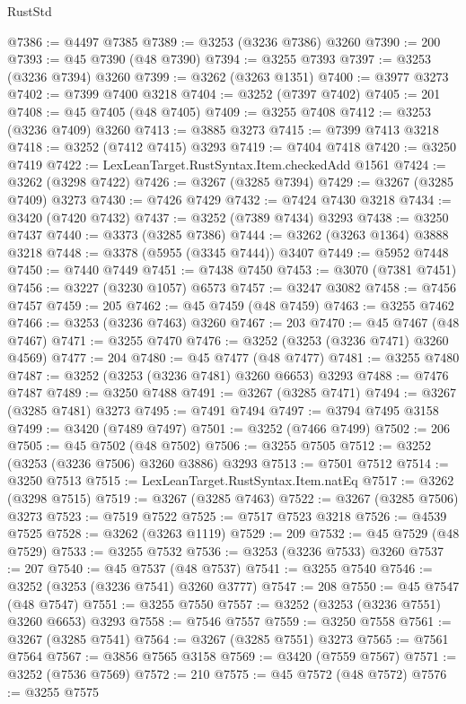 \begin{lexlean}{RustStd}
\begin{coremodule}
@7386 := @4497 @7385
@7389 := @3253 (@3236 @7386) @3260
@7390 := 200
@7393 := @45 @7390 (@48 @7390)
@7394 := @3255 @7393
@7397 := @3253 (@3236 @7394) @3260
@7399 := @3262 (@3263 @1351)
@7400 := @3977 @3273
@7402 := @7399 @7400 @3218
@7404 := @3252 (@7397 @7402)
@7405 := 201
@7408 := @45 @7405 (@48 @7405)
@7409 := @3255 @7408
@7412 := @3253 (@3236 @7409) @3260
@7413 := @3885 @3273
@7415 := @7399 @7413 @3218
@7418 := @3252 (@7412 @7415) @3293
@7419 := @7404 @7418
@7420 := @3250 @7419
@7422 := LexLeanTarget.RustSyntax.Item.checkedAdd @1561
@7424 := @3262 (@3298 @7422)
@7426 := @3267 (@3285 @7394)
@7429 := @3267 (@3285 @7409) @3273
@7430 := @7426 @7429
@7432 := @7424 @7430 @3218
@7434 := @3420 (@7420 @7432)
@7437 := @3252 (@7389 @7434) @3293
@7438 := @3250 @7437
@7440 := @3373 (@3285 @7386)
@7444 := @3262 (@3263 @1364) @3888 @3218
@7448 := @3378 (@5955 (@3345 @7444)) @3407
@7449 := @5952 @7448
@7450 := @7440 @7449
@7451 := @7438 @7450
@7453 := @3070 (@7381 @7451)
@7456 := @3227 (@3230 @1057) @6573
@7457 := @3247 @3082
@7458 := @7456 @7457
@7459 := 205
@7462 := @45 @7459 (@48 @7459)
@7463 := @3255 @7462
@7466 := @3253 (@3236 @7463) @3260
@7467 := 203
@7470 := @45 @7467 (@48 @7467)
@7471 := @3255 @7470
@7476 := @3252 (@3253 (@3236 @7471) @3260 @4569)
@7477 := 204
@7480 := @45 @7477 (@48 @7477)
@7481 := @3255 @7480
@7487 := @3252 (@3253 (@3236 @7481) @3260 @6653) @3293
@7488 := @7476 @7487
@7489 := @3250 @7488
@7491 := @3267 (@3285 @7471)
@7494 := @3267 (@3285 @7481) @3273
@7495 := @7491 @7494
@7497 := @3794 @7495 @3158
@7499 := @3420 (@7489 @7497)
@7501 := @3252 (@7466 @7499)
@7502 := 206
@7505 := @45 @7502 (@48 @7502)
@7506 := @3255 @7505
@7512 := @3252 (@3253 (@3236 @7506) @3260 @3886) @3293
@7513 := @7501 @7512
@7514 := @3250 @7513
@7515 := LexLeanTarget.RustSyntax.Item.natEq
@7517 := @3262 (@3298 @7515)
@7519 := @3267 (@3285 @7463)
@7522 := @3267 (@3285 @7506) @3273
@7523 := @7519 @7522
@7525 := @7517 @7523 @3218
@7526 := @4539 @7525
@7528 := @3262 (@3263 @1119)
@7529 := 209
@7532 := @45 @7529 (@48 @7529)
@7533 := @3255 @7532
@7536 := @3253 (@3236 @7533) @3260
@7537 := 207
@7540 := @45 @7537 (@48 @7537)
@7541 := @3255 @7540
@7546 := @3252 (@3253 (@3236 @7541) @3260 @3777)
@7547 := 208
@7550 := @45 @7547 (@48 @7547)
@7551 := @3255 @7550
@7557 := @3252 (@3253 (@3236 @7551) @3260 @6653) @3293
@7558 := @7546 @7557
@7559 := @3250 @7558
@7561 := @3267 (@3285 @7541)
@7564 := @3267 (@3285 @7551) @3273
@7565 := @7561 @7564
@7567 := @3856 @7565 @3158
@7569 := @3420 (@7559 @7567)
@7571 := @3252 (@7536 @7569)
@7572 := 210
@7575 := @45 @7572 (@48 @7572)
@7576 := @3255 @7575

\end{coremodule}
\end{lexlean}
